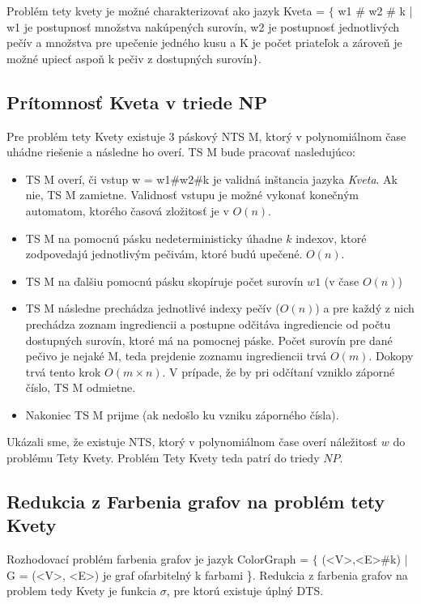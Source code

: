 \documentclass[10pt]{article}
\begin{document}
Problém tety kvety je možné charakterizovať ako jazyk Kveta = $\{$ w1 \# w2 \# k | w1 je postupnosť množstva nakúpených surovín, w2 je postupnosť jednotlivých pečív a množstva pre upečenie jedného kusu a K je počet priateľok a zároveň je možné upiecť aspoň k pečiv z dostupných surovín$\}$.
\subsection*{Prítomnosť Kveta v triede NP}
Pre problém tety Kvety existuje 3 páskový NTS M, ktorý v polynomiálnom čase uhádne riešenie a následne ho overí.
TS M bude pracovať nasledujúco:
\begin{itemize}
    \item TS M overí, či vstup w = w1\#w2\#k je validná inštancia jazyka \textit{Kveta}. Ak nie, TS M zamietne. Validnosť vstupu je možné vykonať konečným automatom, ktorého časová zložitosť je v $O(n)$. 
    \item TS M na pomocnú pásku nedeterministicky úhadne $k$ indexov, ktoré zodpovedajú jednotlivým pečivám, ktoré budú upečené. $O(n)$.
    \item TS M na ďalšiu pomocnú pásku skopíruje počet surovín $w1$  (v čase $O(n)$)
    \item TS M následne prechádza jednotlivé indexy pečív ($O(n)$) a pre každý z nich prechádza zoznam ingrediencii a postupne odčitáva ingrediencie od počtu dostupných surovín, ktoré má na pomocnej páske. Počet surovín pre dané pečivo je nejaké M, teda prejdenie zoznamu ingrediencii trvá $O(m)$. Dokopy trvá tento krok $O(m \times n )$.
 V prípade, že by pri odčítaní vzniklo záporné číslo, TS M odmietne.
    \item Nakoniec TS M prijme (ak nedošlo ku vzniku záporného čísla).
\end{itemize}

Ukázali sme, že existuje NTS, ktorý v polynomiálnom čase overí náležitosť $w$ do problému Tety Kvety. Problém Tety Kvety teda patrí do triedy $NP$.

\subsection*{Redukcia z Farbenia grafov na problém tety Kvety}

Rozhodovací problém farbenia grafov je jazyk ColorGraph = $\{$ (<V>,<E>\#k) | G = (<V>, <E>) je graf
ofarbitelný k farbami \}.
Redukcia z farbenia grafov na problem tedy Kvety je funkcia $\sigma$, pre ktorú existuje úplný DTS.
\end{document}
